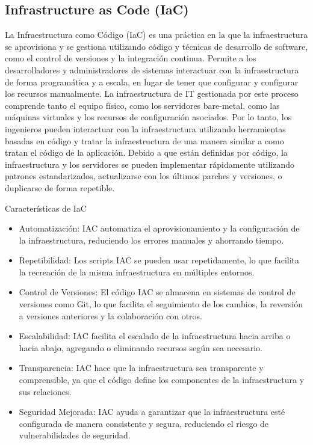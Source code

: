 \documentclass[12pt]{book}
\begin{document}
\subsection{Infrastructure as Code (IaC)}
 
La Infraestructura como Código (IaC) es una práctica en la que la infraestructura se aprovisiona y se gestiona utilizando código y técnicas de desarrollo de software, como el control de versiones y la integración continua. Permite a los desarrolladores y administradores de sistemas interactuar con la infraestructura de forma programática y a escala, en lugar de tener que configurar y configurar los recursos manualmente.
La infraestructura de IT gestionada por este proceso comprende tanto el equipo físico, como los servidores bare-metal, como las máquinas virtuales y los recursos de configuración asociados.
Por lo tanto, los ingenieros pueden interactuar con la infraestructura utilizando herramientas basadas en código y tratar la infraestructura de una manera similar a como tratan el código de la aplicación. Debido a que están definidas por código, la infraestructura y los servidores se pueden implementar rápidamente utilizando patrones estandarizados, actualizarse con los últimos parches y versiones, o duplicarse de forma repetible.

Características de IaC

\begin{itemize}
    \item Automatización: IAC automatiza el aprovisionamiento y la configuración de la infraestructura, reduciendo los errores manuales y ahorrando tiempo.
    \item Repetibilidad: Los scripts IAC se pueden usar repetidamente, lo que facilita la recreación de la misma infraestructura en múltiples entornos.
    \item Control de Versiones: El código IAC se almacena en sistemas de control de versiones como Git, lo que facilita el seguimiento de los cambios, la reversión a versiones anteriores y la colaboración con otros.
    \item Escalabilidad: IAC facilita el escalado de la infraestructura hacia arriba o hacia abajo, agregando o eliminando recursos según sea necesario.
    \item Transparencia: IAC hace que la infraestructura sea transparente y comprensible, ya que el código define los componentes de la infraestructura y sus relaciones.
    \item Seguridad Mejorada: IAC ayuda a garantizar que la infraestructura esté configurada de manera consistente y segura, reduciendo el riesgo de vulnerabilidades de seguridad.
\end{itemize}
\end{document}
